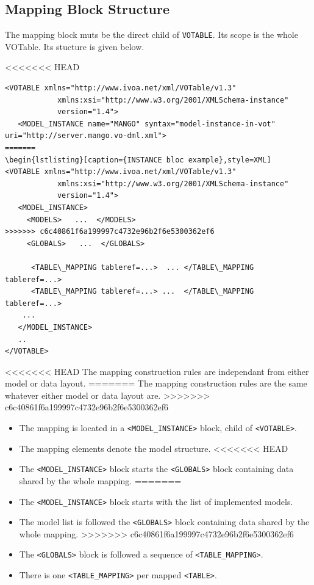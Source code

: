 \documentclass[11pt,a4paper]{ivoa}
\begin{document}
\subsection{Mapping Block Structure}

The mapping block muts be the direct child of \texttt{VOTABLE}. Its scope is the whole VOTable. Its stucture is given below.

<<<<<<< HEAD
\begin{lstlisting}[caption={Complete mapping block example},style=XML]
<VOTABLE xmlns="http://www.ivoa.net/xml/VOTable/v1.3" 
            xmlns:xsi="http://www.w3.org/2001/XMLSchema-instance" 
            version="1.4">
   <MODEL_INSTANCE name="MANGO" syntax="model-instance-in-vot"  uri="http://server.mango.vo-dml.xml">
=======
\begin{lstlisting}[caption={INSTANCE bloc example},style=XML]
<VOTABLE xmlns="http://www.ivoa.net/xml/VOTable/v1.3" 
            xmlns:xsi="http://www.w3.org/2001/XMLSchema-instance" 
            version="1.4">
   <MODEL_INSTANCE>
     <MODELS>   ...  </MODELS>
>>>>>>> c6c40861f6a199997c4732e96b2f6e5300362ef6
     <GLOBALS>   ...  </GLOBALS>

      <TABLE\_MAPPING tableref=...>  ... </TABLE\_MAPPING tableref=...>
      <TABLE\_MAPPING tableref=...> ...  </TABLE\_MAPPING tableref=...>
    ...
   </MODEL_INSTANCE>
   ..
</VOTABLE>
\end{lstlisting}

<<<<<<< HEAD
The mapping construction rules are independant from either model or data layout.
=======
The mapping construction rules are the same whatever either model or data layout are.
>>>>>>> c6c40861f6a199997c4732e96b2f6e5300362ef6

\begin{itemize}
    \item The mapping is located in a \texttt{<MODEL\_INSTANCE>} block, child of \texttt{<VOTABLE>}.
    \item The mapping elements denote the model structure.
<<<<<<< HEAD
    \item The \texttt{<MODEL\_INSTANCE>} block starts the \texttt{<GLOBALS>} block containing data shared by the whole mapping.    
=======
    \item The \texttt{<MODEL\_INSTANCE>} block starts with the list of implemented models.
    \item The model list is followed the \texttt{<GLOBALS>} block containing data shared by the whole mapping.    
>>>>>>> c6c40861f6a199997c4732e96b2f6e5300362ef6
    \item The \texttt{<GLOBALS>} block is followed a sequence of \texttt{<TABLE\_MAPPING>}.
    \item There is one \texttt{<TABLE\_MAPPING>} per mapped \texttt{<TABLE>}.
\end{itemize}
\FloatBarrier
\end{document}
